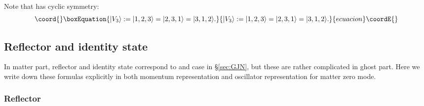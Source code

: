 \documentclass[12pt,a4paper]{article}
\begin{document}
Note that \coordHE{} has cyclic symmetry:
\begin{equation}\coord{}\boxEquation{
|V_3\rangle:=|1,2,3\rangle=|2,3,1\rangle=|3,1,2\rangle.
}{
|V_3\rangle:=|1,2,3\rangle=|2,3,1\rangle=|3,1,2\rangle.
}{ecuacion}\coordE{}\end{equation}

\subsection{Reflector and identity state}

In matter part, reflector and identity state correspond to \coordHE{} and \coordHE{} case in \S \ref{sec:GJN}, but these are rather complicated in ghost part. Here we write down these formulas explicitly in both momentum representation and oscillator representation for matter zero mode.

\subsubsection{Reflector}
\end{document}
